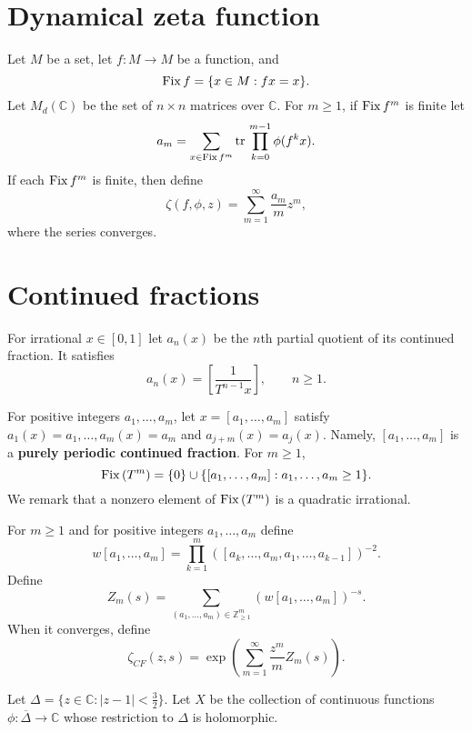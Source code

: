 \documentclass{article}
\newcommand{\tr}{\ensuremath\mathrm{tr}\,}
\newcommand{\Fix}{\ensuremath\mathrm{Fix}\,}
\theoremstyle{definition}
\begin{document}
\section{Dynamical zeta function}
Let $M$ be a set, let $f:M \to M$ be a function, and 
\[
\Fix f = \{x \in M : fx=x\}.
\]
Let $M_d(\mathbb{C})$ be the set of  $n \times n$ matrices over $\mathbb{C}$. 
For $m \geq 1$, if $\Fix f^m$ is finite let
\[
a_m = \sum_{x \in \Fix f^m} \tr \prod_{k=0}^{m-1} \phi(f^k x).
\]
If each $\Fix f^m$ is finite, then define
\[
\zeta(f,\phi,z) = \sum_{m=1}^\infty \frac{a_m}{m} z^m,
\]
where the series converges.




\section{Continued fractions}
For irrational $x \in [0,1]$ let $a_n(x)$ be the $n$th partial quotient of its continued fraction. It satisfies
\[
a_n(x) = \left[ \frac{1}{T^{n-1}x}\right],\qquad n \geq 1.
\]

For positive integers $a_1,\ldots,a_m$, let $x=[a_1,\ldots,a_m]$ satisfy
$a_1(x)=a_1,\ldots,a_m(x)=a_m$ and $a_{j+m}(x)=a_j(x)$. 
Namely, $[a_1,\ldots,a_m]$ is a \textbf{purely periodic continued fraction}.
For $m \geq 1$,
\[
\Fix(T^m) = \{0\} \cup \{[a_1,\ldots,a_m]: a_1,\ldots,a_m \geq 1\}.
\]
We remark that a nonzero element of $\Fix(T^m)$ is a quadratic irrational.

For $m \geq 1$ and
for positive integers $a_1,\ldots,a_m$ define
\[
w [a_1,\ldots,a_m] = \prod_{k=1}^m ([a_k,\ldots,a_m,a_1,\ldots,a_{k-1}])^{-2}.
\]
Define
\[
Z_m(s) =  \sum_{(a_1,\ldots,a_m) \in \mathbb{Z}_{\geq 1}^m} (w[a_1,\ldots,a_m])^{-s}.
\]
When it converges, define
\[
\zeta_{CF}(z,s) = \exp\left( \sum_{m=1}^\infty \frac{z^m}{m} Z_m(s) \right).
\]




Let $\Delta=\{z \in \mathbb{C}: |z-1| < \frac{3}{2}\}$.
Let $X$ be the collection of continuous functions $\phi:\overline{\Delta} \to \mathbb{C}$ whose
restriction to $\Delta$ is holomorphic. 
\end{document}

